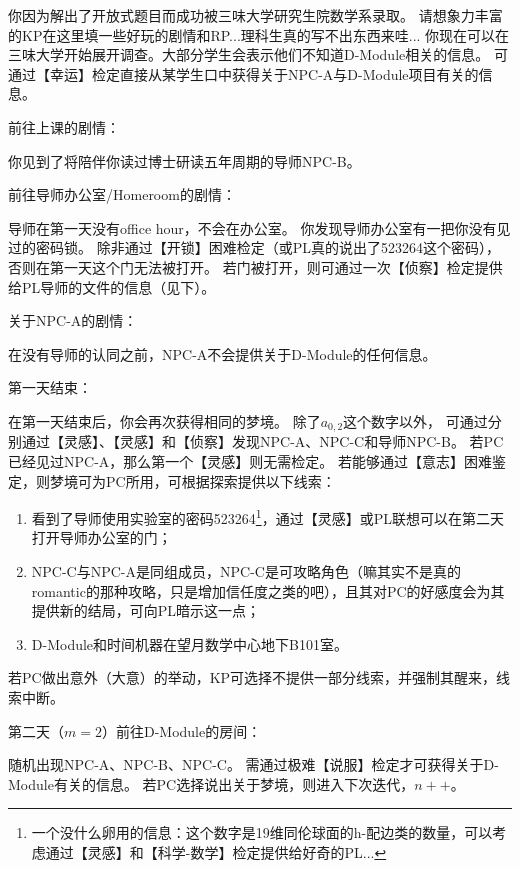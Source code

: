 \documentclass[12pt]{report}
\begin{document}
\color{black}
你因为解出了开放式题目而成功被三味大学研究生院数学系录取。
\color{red}
请想象力丰富的KP在这里填一些好玩的剧情和RP...理科生真的写不出东西来哇...
\color{black}
你现在可以在三味大学开始展开调查。大部分学生会表示他们不知道D-Module相关的信息。
\color{blue}
可通过【幸运】检定直接从某学生口中获得关于NPC-A与D-Module项目有关的信息。

\color{green}
前往上课的剧情：

\color{black}
你见到了将陪伴你读过博士研读五年周期的导师NPC-B。


\color{green}
前往导师办公室/Homeroom的剧情：

\color{black}
导师在第一天没有office hour，不会在办公室。
你发现导师办公室有一把你没有见过的密码锁。
\color{blue}
除非通过【开锁】困难检定（或PL真的说出了523264这个密码），否则在第一天这个门无法被打开。
若门被打开，则可通过一次【侦察】检定提供给PL导师的文件的信息（见下）。
\color{black}

\color{green}
关于NPC-A的剧情：

\color{black}
在没有导师的认同之前，NPC-A不会提供关于D-Module的任何信息。

\color{green}
第一天结束：

\color{black}
在第一天结束后，你会再次获得相同的梦境。
除了$a_{0,2}$这个数字以外，
\color{blue}
可通过分别通过【灵感】、【灵感】和【侦察】发现NPC-A、NPC-C和导师NPC-B。
若PC已经见过NPC-A，那么第一个【灵感】则无需检定。
若能够通过【意志】困难鉴定，则梦境可为PC所用，可根据探索提供以下线索：
\begin{enumerate}
\item 看到了导师使用实验室的密码523264\footnote{\color{blue}一个没什么卵用的信息：这个数字是19维同伦球面的h-配边类的数量，可以考虑通过【灵感】和【科学-数学】检定提供给好奇的PL...}，通过【灵感】或PL联想可以在第二天打开导师办公室的门；
\item NPC-C与NPC-A是同组成员，\color{red}NPC-C是可攻略角色（嘛其实不是真的romantic的那种攻略，只是增加信任度之类的吧），且其对PC的好感度会为其提供新的结局，可向PL暗示这一点\color{blue}；
\item D-Module和时间机器在望月数学中心地下B101室。
\end{enumerate}
\color{red}
若PC做出意外（大意）的举动，KP可选择不提供一部分线索，并强制其醒来，线索中断。

\color{green}
第二天（$m=2$）前往D-Module的房间：

\color{red}
随机出现NPC-A、NPC-B、NPC-C。
\color{blue}
需通过极难【说服】检定才可获得关于D-Module有关的信息。
若PC选择说出关于梦境，则进入下次迭代，$n++$。
\end{document}
